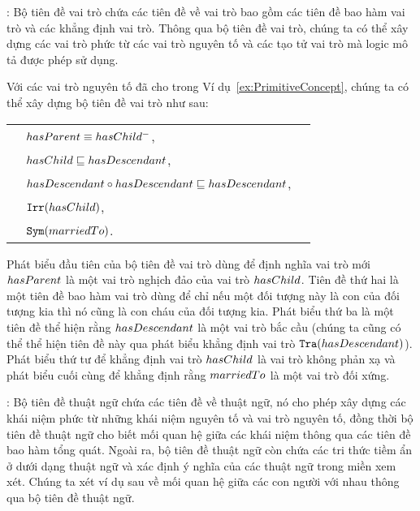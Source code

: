 : Bộ tiên đề vai trò chứa các tiên đề về vai trò bao gồm các tiên đề bao hàm vai trò và các khẳng định vai trò. Thông qua bộ tiên đề vai trò, chúng ta có thể xây dựng các vai trò phức từ các vai trò nguyên tố và các tạo tử vai trò mà logic mô tả được phép sử dụng.

\begin{Example}
	\label{ex:RBox}
	Với các vai trò nguyên tố đã cho trong Ví dụ~\ref{ex:PrimitiveConcept}, chúng ta có thể xây dựng bộ tiên đề vai trò như sau:\\[1.0ex]
	\begin{tabular}{c l l}
		& $hasParent \equiv hasChild^-$, & \\[0.5ex]
		& $hasChild \sqsubseteq hasDescendant$, & \\[0.5ex]
		& $hasDescendant \circ hasDescendant \sqsubseteq hasDescendant$, & \\[0.5ex]
		& $\mathtt{Irr}(hasChild)$, & \\[0.5ex]
		& $\mathtt{Sym}(marriedTo)$. &
	\end{tabular}
	
Phát biểu đầu tiên của bộ tiên đề vai trò dùng để định nghĩa vai trò mới $hasParent$ là một vai trò nghịch đảo của vai trò $hasChild$. Tiên đề thứ hai là một tiên đề bao hàm vai trò dùng để chỉ nếu một đối tượng này là con của đối tượng kia thì nó cũng là con cháu của đối tượng kia. Phát biểu thứ ba là một tiên đề thể hiện rằng $hasDescendant$ là một vai trò bắc cầu (chúng ta cũng có thể thể hiện tiên đề này qua phát biểu khẳng định vai trò $\mathtt{Tra}(hasDescendant)$). Phát biểu thứ tư để khẳng định vai trò $hasChild$ là vai trò không phản xạ và phát biểu cuối cùng để khẳng định rằng $marriedTo$ là một vai trò đối xứng.\myend
\end{Example}

: Bộ tiên đề thuật ngữ chứa các tiên đề về thuật ngữ, nó cho phép xây dựng các khái niệm phức từ những khái niệm nguyên tố và vai trò nguyên tố, đồng thời bộ tiên đề thuật ngữ cho biết mối quan hệ giữa các khái niệm thông qua các tiên đề bao hàm tổng quát. Ngoài ra, bộ tiên đề thuật ngữ còn chứa các tri thức tiềm ẩn ở dưới dạng thuật ngữ và xác định ý nghĩa của các thuật ngữ trong miền xem xét.
Chúng ta xét ví dụ sau về mối quan hệ giữa các con người với nhau thông qua bộ tiên đề thuật ngữ.

